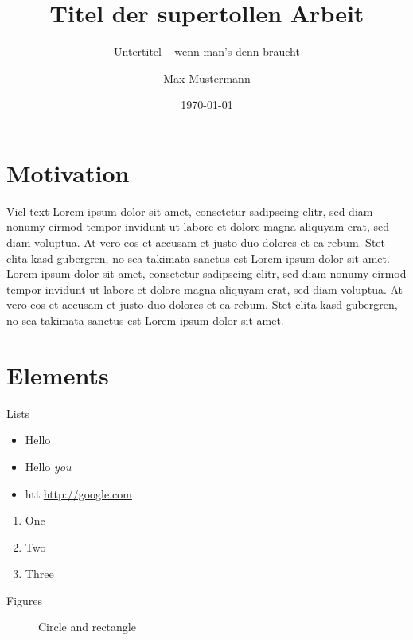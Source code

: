 \documentclass[compress]{beamer}
\title{Titel der supertollen Arbeit}
\subtitle{Untertitel -- wenn man's denn braucht}
\date{\today}
\author{Max Mustermann}
\institute{Institut für so und so\\Universtität Bla}
\begin{document}
\maketitle


\section{Motivation}

\begin{frame}{Viel text}
Lorem ipsum dolor sit amet, consetetur sadipscing elitr, sed diam nonumy eirmod
tempor invidunt ut labore et dolore magna aliquyam erat, sed diam voluptua. At
vero eos et accusam et justo duo dolores et ea rebum. Stet clita kasd gubergren,
no sea takimata sanctus est Lorem ipsum dolor sit amet. Lorem ipsum dolor sit
amet, consetetur sadipscing elitr, sed diam nonumy eirmod tempor invidunt ut
labore et dolore magna aliquyam erat, sed diam voluptua. At vero eos et accusam
et justo duo dolores et ea rebum. Stet clita kasd gubergren, no sea takimata
sanctus est Lorem ipsum dolor sit amet.
\end{frame}


\section{Elements}

\begin{frame}{Lists}
  \begin{itemize}
    \item Hello
    \item Hello \emph{you}
    \item htt \url{http://google.com}
  \end{itemize}

  \begin{enumerate}
    \item One
    \item Two
    \item Three
  \end{enumerate}
\end{frame}

\begin{frame}{Figures}
  \begin{figure}
    \caption{Circle and rectangle}
  \end{figure}
\end{frame}
\end{document}
